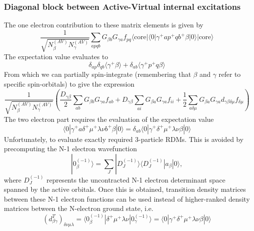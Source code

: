 \documentclass[a4paper,oneside,11pt]{article}
\numberwithin{equation}{section}
\newcommand{\DMETBra}{\langle \mathrm{core}|\langle 0|}
\newcommand{\DMETKet}{|0\rangle| \mathrm{core} \rangle}
\begin{document}
\subsubsection{Diagonal block between Active-Virtual internal excitations}
\label{sec:AVDiag}
The one electron contribution to these matrix elements is given by
\begin{equation}
\frac{1}{\sqrt{N^{(AV)}_{\beta}N^{(AV)}_{\gamma}}} \sum_{apqb} G_{\beta b} G_{\gamma a} f_{pq} \DMETBra \gamma^{+} a p^{+} q b^{+} \beta \DMETKet
\end{equation}
The expectation value evaluates to
\begin{equation}
\delta_{ap} \delta_{qb} \langle \gamma^{+} \beta \rangle + \delta_{ab} \langle \gamma^{+} p^{+} q \beta \rangle
\end{equation}
From which we can partially spin-integrate (remembering that $\beta$ and $\gamma$ refer to specific spin-orbitals) to give the expression
\begin{equation}
\frac{1}{\sqrt{N^{(AV)}_{\beta}N^{(AV)}_{\gamma}}} \left( \frac{D_{\gamma \beta}}{2} \sum_{ab} G_{\beta b} G_{\gamma a} f_{ab} + D_{\gamma \beta} \sum_{ai} G_{\beta a} G_{\gamma a} f_{ii} + \frac{1}{2}\sum_{a \delta \mu} G_{\beta a} G_{\gamma a} d_{\gamma \beta \delta \mu} f_{\delta \mu} \right )
\end{equation}
The two electron part requires the evaluation of the expectation value
\begin{equation}
\langle 0 | \gamma^{+} a \delta^{+} \mu^{+} \lambda \nu b^{+} \beta | 0 \rangle = \delta_{ab} \langle 0 | \gamma^{+} \delta^{+} \mu^{+} \lambda \nu \beta | 0 \rangle
\end{equation}
Unfortunately, to evaluate exactly required 3-particle RDMs. This is avoided by precomputing the N-1 electron wavefunction
\begin{equation}
|0^{(-1)}_{\beta} \rangle = \sum_J |D_J^{(-1)} \rangle \langle D_J^{(-1)} | a_{\beta} |0\rangle ,
\end{equation}
where $D_J^{(-1)}$ represents the uncontracted N-1 electron determinant space spanned by the active orbitals.
Once this is obtained, transition density matrices between these N-1 electron functions can be used instead of higher-ranked density matrices between the N-electron ground state, i.e.
\begin{equation}
(d^T_{\beta \gamma})_{\delta \nu \mu \lambda} = \langle 0^{(-1)}_{\beta} | \delta^{+} \mu^{+} \lambda \nu | 0^{(-1)}_{\gamma} \rangle = \langle 0 | \gamma^{+} \delta^{+} \mu^{+} \lambda \nu \beta | 0 \rangle
\end{equation}
\end{document}
